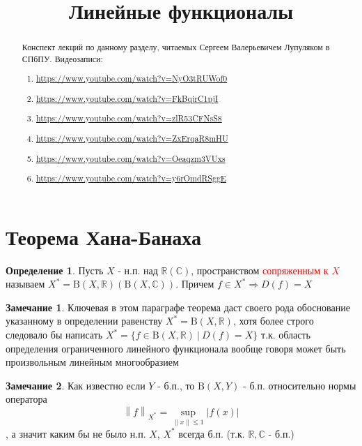 \documentclass[12pt,a4paper]{article}
\title{Линейные функционалы}
\date{}
\theoremstyle{definition}
\newtheorem{definition}{Определение}[section]
\newtheorem{corollarydf}{Замечание}[definition]
\newcommand{\Real}{\mathbb{R}}
\newcommand{\Cmplx}{\mathbb{C}}
\newcommand{\norm}[1]{\left\lVert#1\right\rVert}
\newcommand{\setbuild}[2]{\{#1\:|\:#2\}}
\newcommand{\bounded}[2]{\textrm{B}(#1, #2)}
\begin{document}
\maketitle

\begin{abstract}
	Конспект лекций по данному разделу, читаемых Сергеем Валерьевичем Лупуляком в СПбПУ. Видеозаписи:
	\begin{enumerate}
		\item \url{https://www.youtube.com/watch?v=NyO3tRUWof0}
		\item \url{https://www.youtube.com/watch?v=FkBqjrC1pjI}
		\item \url{https://www.youtube.com/watch?v=zlR53CFNsS8}
		\item \url{https://www.youtube.com/watch?v=ZxErqaR8mHU}
		\item \url{https://www.youtube.com/watch?v=Oeaqzm3VUxs}
		\item \url{https://www.youtube.com/watch?v=y6rOmdRSggE}
	\end{enumerate}
	
\end{abstract}

\newpage

\section{Теорема Хана-Банаха}

\begin{definition}
	Пусть $X$ - н.п. над $\Real(\Cmplx)$, пространством \textcolor{red}{сопряженным к $X$} называем $X^*=\bounded{X}{\Real}(\bounded{X}{\Cmplx})$. Причем $f\in X^*\Rightarrow D(f)=X$
\end{definition}
\begin{corollarydf}
	Ключевая в этом параграфе теорема даст своего рода обоснование указанному в определении равенству $X^*=\bounded{X}{\Real}$, хотя более строго следовало бы написать $X^*=\setbuild{f\in \bounded{X}{\Real}}{D(f)=X}$ т.к. область определения ограниченного линейного функционала вообще говоря может быть произвольным линейным многообразием
\end{corollarydf}
\begin{corollarydf}
	Как известно если $Y$ - б.п., то $\bounded{X}{Y}$ - б.п. относительно нормы оператора $$\norm{f}_{X^*}=\sup_{\norm{x}\leq1}|f(x)|$$, а значит каким бы не было н.п. $X$, $X^*$ всегда б.п. (т.к. $\Real,\Cmplx$ - б.п.)
\end{corollarydf}
\end{document}

